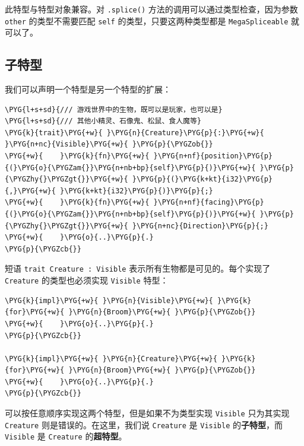 此特型与特型对象兼容。对 \texttt{.splice()} 方法的调用可以通过类型检查，因为参数 \texttt{other} 的类型不需要匹配 \texttt{self} 的类型，只要这两种类型都是 \texttt{MegaSpliceable} 就可以了。

\subsection{子特型}

我们可以声明一个特型是另一个特型的扩展：

\begin{Verbatim}[commandchars=\\\{\},breaklines=true,breakanywhere=true,fontsize=\codefont,xleftmargin=17bp]
\PYG{l+s+sd}{/// 游戏世界中的生物，既可以是玩家，也可以是}
\PYG{l+s+sd}{/// 其他小精灵、石像鬼、松鼠、食人魔等}
\PYG{k}{trait}\PYG{+w}{ }\PYG{n}{Creature}\PYG{p}{:}\PYG{+w}{ }\PYG{n+nc}{Visible}\PYG{+w}{ }\PYG{p}{\PYGZob{}}
\PYG{+w}{    }\PYG{k}{fn}\PYG{+w}{ }\PYG{n+nf}{position}\PYG{p}{(}\PYG{o}{\PYGZam{}}\PYG{n+nb+bp}{self}\PYG{p}{)}\PYG{+w}{ }\PYG{p}{\PYGZhy{}\PYGZgt{}}\PYG{+w}{ }\PYG{p}{(}\PYG{k+kt}{i32}\PYG{p}{,}\PYG{+w}{ }\PYG{k+kt}{i32}\PYG{p}{)}\PYG{p}{;}
\PYG{+w}{    }\PYG{k}{fn}\PYG{+w}{ }\PYG{n+nf}{facing}\PYG{p}{(}\PYG{o}{\PYGZam{}}\PYG{n+nb+bp}{self}\PYG{p}{)}\PYG{+w}{ }\PYG{p}{\PYGZhy{}\PYGZgt{}}\PYG{+w}{ }\PYG{n+nc}{Direction}\PYG{p}{;}
\PYG{+w}{    }\PYG{o}{..}\PYG{p}{.}
\PYG{p}{\PYGZcb{}}
\end{Verbatim}

短语 \texttt{trait Creature : Visible} 表示所有生物都是可见的。每个实现了 \texttt{Creature} 的类型也必须实现 \texttt{Visible} 特型：

\begin{Verbatim}[commandchars=\\\{\},breaklines=true,breakanywhere=true,fontsize=\codefont,xleftmargin=17bp]
\PYG{k}{impl}\PYG{+w}{ }\PYG{n}{Visible}\PYG{+w}{ }\PYG{k}{for}\PYG{+w}{ }\PYG{n}{Broom}\PYG{+w}{ }\PYG{p}{\PYGZob{}}
\PYG{+w}{    }\PYG{o}{..}\PYG{p}{.}
\PYG{p}{\PYGZcb{}}

\PYG{k}{impl}\PYG{+w}{ }\PYG{n}{Creature}\PYG{+w}{ }\PYG{k}{for}\PYG{+w}{ }\PYG{n}{Broom}\PYG{+w}{ }\PYG{p}{\PYGZob{}}
\PYG{+w}{    }\PYG{o}{..}\PYG{p}{.}
\PYG{p}{\PYGZcb{}}
\end{Verbatim}

可以按任意顺序实现这两个特型，但是如果不为类型实现 \texttt{Visible} 只为其实现 \texttt{Creature} 则是错误的。在这里，我们说 \texttt{Creature} 是 \texttt{Visible} 的\textbf{子特型}，而 \texttt{Visible} 是 \texttt{Creature} 的\textbf{超特型}。

